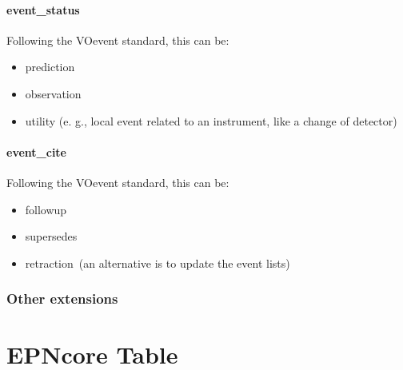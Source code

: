 \documentclass[11pt,a4paper]{ivoa}
\begin{document}
\paragraph{event\_status}

Following the VOevent standard, this can be:

\begin{itemize}
\item prediction
\item observation
\item utility (e. g., local event related to an instrument, like a change of detector)
\end{itemize}

\paragraph{event\_cite}

Following the VOevent standard, this can be:

\begin{itemize}
\item followup
\item supersedes
\item retraction (an alternative is to update the event lists)
\end{itemize}

\subsubsection{Other extensions\\}




\section{EPNcore Table}
\end{document}
